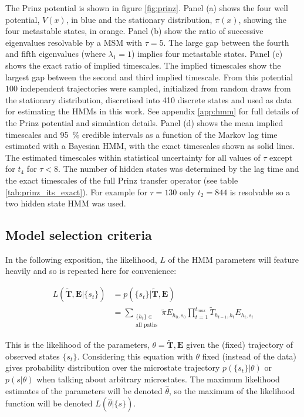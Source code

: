 The Prinz potential \cite{prinzMarkovModelsMolecular2011} is shown in figure \ref{fig:prinz}.  Panel (a) shows the four well potential, $V(x)$, in blue and the stationary distribution, $\pi(x)$, showing the four metastable states, in orange. Panel (b) show the  ratio of successive eigenvalues resolvable by a  MSM with $\tau=5$. The large gap between the fourth and fifth eigenvalues (where $\lambda_1=1$) implies four metastable states. Panel (c) shows the exact ratio of implied timescales. The implied timescales show the largest gap between the second and third implied timescale. From this potential $100$ independent trajectories were sampled, initialized from random draws from the stationary distribution, discretised into 410 discrete states and used as data for estimating the HMMs in this work. See appendix \ref{app:hmm} for full details of the Prinz potential and simulation details. Panel (d) shows the mean implied timescales and \SI{95}{\percent} credible intervals as a function of the Markov lag time estimated with a Bayesian HMM, with the exact timescales shown as solid lines. The estimated timescales within statistical uncertainty for all values of $\tau$ except for $t_{4}$ for $\tau < 8$.  The number of hidden states was determined by the lag time and the exact timescales of the full Prinz transfer operator (see table \ref{tab:prinz_its_exact}). For example for $\tau = 130$ only $t_2 = 844$ is resolvable so a two hidden state HMM was used.


\subsection{Model selection criteria}

In the following exposition, the likelihood, $L$ of the HMM parameters will feature heavily and so is repeated here for convenience\cite{noeProjectedHiddenMarkov2013a}: 

\begin{equation}\label{eqn:obs_lik_full}
\begin{split}
    L(\tilde{\mathbf{T}}, \mathbf{E}| \{s_t\}) & = p(\{s_t\} | \tilde{\mathbf{T}}, \mathbf{E}) \\
    & = \sum_{\substack{\{h_t\} \in \\ \text{all paths}}} \tilde{\pi}E_{ h_{0}, s_{0}}\prod_{t=1}^{t_{max}}\tilde{T}_{h_{t-1}, h_t}E_{h_t, s_t}    
\end{split}
\end{equation}

This is the likelihood of the parameters, $\theta = \tilde{\mathbf{T}}, \mathbf{E}$ given the (fixed) trajectory of observed states $\{s_t\}$. Considering this equation with $\theta$ fixed (instead of the data) gives probability distribution over the microstate trajectory $p(\{s_t\}|\theta)$ or $p(s|\theta)$ when talking about arbitrary microstates.  The maximum likelihood estimates of the parameters will be denoted $\hat{\theta}$, so the maximum of the likelihood function will be denoted $L(\hat{\theta}|\{s\})$. 


